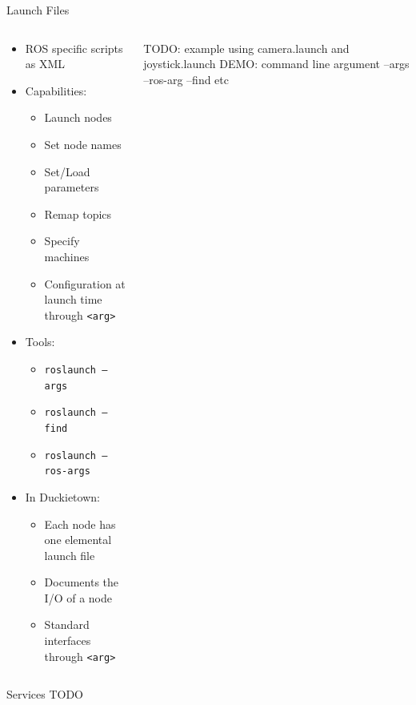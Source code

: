 \documentclass{beamer}
\newcommand{\bashinline}[1]{\texttt{#1}}
\begin{document}
\begin{frame}{Launch Files}
	\begin{columns}
		\begin{column}{0.6\textwidth}
			\begin{itemize}
				\item ROS specific scripts as XML
				\item Capabilities:
					\begin{itemize}
						\item Launch nodes
						\item Set node names
						\item Set/Load parameters
						\item Remap topics
						\item Specify machines
						\item Configuration at launch time through \bashinline{<arg>}
					\end{itemize}
				\item Tools:
					\begin{itemize}
						\item \bashinline{roslaunch --args}
						\item \bashinline{roslaunch --find}
						\item \bashinline{roslaunch --ros-args}
					\end{itemize}
				\item In Duckietown:
					\begin{itemize}
						\item Each node has one elemental launch file
						\item Documents the I/O of a node
						\item Standard interfaces through \bashinline{<arg>}
					\end{itemize}
			\end{itemize}
		\end{column}
	\begin{column}{0.4\textwidth}
		\centering
		TODO: example using camera.launch and joystick.launch
		DEMO: command line argument --args --ros-arg --find etc
		\end{column}
	\end{columns}
\end{frame}

\begin{frame}{Services}
	TODO
\end{frame}
\end{document}
